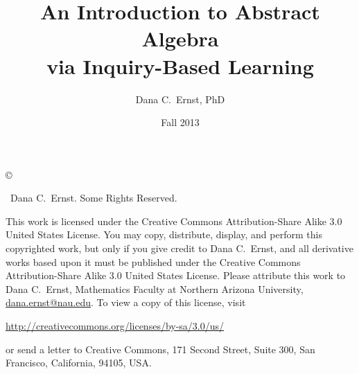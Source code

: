 \documentclass[12pt,oneside]{book}
\begin{document}
\title{An Introduction to Abstract Algebra\\
via Inquiry-Based Learning}
\author{Dana C.~Ernst, PhD}
\date{Fall 2013}
\maketitle

\thispagestyle{empty}
\noindent\copyright{ \the\year\ Dana C.~Ernst.  Some Rights Reserved.\\

\bigskip

\noindent This work is licensed under the Creative Commons Attribution-Share Alike 3.0 United States License.  You may copy, distribute, display, and perform this copyrighted work, but only if you give credit to Dana C.~Ernst, and all derivative works based upon it must be published under the Creative Commons Attribution-Share Alike 3.0 United States License. Please attribute this work to Dana C.~Ernst, Mathematics Faculty at Northern Arizona University, \url{dana.ernst@nau.edu}. To view a copy of this license, visit
\begin{center}
\url{http://creativecommons.org/licenses/by-sa/3.0/us/}
\end{center}
or send a letter to Creative Commons, 171 Second Street, Suite 300, San Francisco, California, 94105, USA.}



\end{document}
